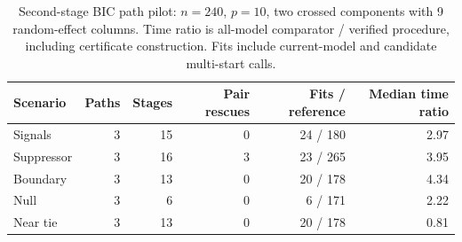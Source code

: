 \begin{table}[H]\centering\small
\begin{tabular}{lrrrrr}
\toprule
Scenario & Paths & Stages & Pair rescues & Fits / reference & Median time ratio \\
\midrule
Signals & 3 & 15 & 0 & 24 / 180 & 2.97 \\
Suppressor & 3 & 16 & 3 & 23 / 265 & 3.95 \\
Boundary & 3 & 13 & 0 & 20 / 178 & 4.34 \\
Null & 3 & 6 & 0 & 6 / 171 & 2.22 \\
Near tie & 3 & 13 & 0 & 20 / 178 & 0.81 \\
\bottomrule
\end{tabular}
\caption{Second-stage BIC path pilot: $n=240$, $p=10$, two crossed components with 9 random-effect columns. Time ratio is all-model comparator / verified procedure, including certificate construction. Fits include current-model and candidate multi-start calls.}
\end{table}
